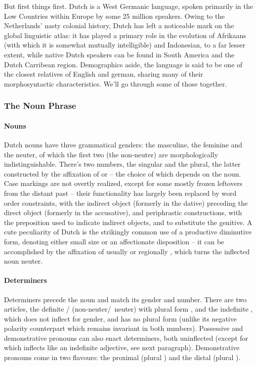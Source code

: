 But first things first.
Dutch is a West Germanic language, spoken primarily in the Low Countries within Europe by some 25 million speakers.
Owing to the Netherlands' nasty colonial history, Dutch has left a noticeable mark on the global linguistic atlas: it has played a primary role in the evolution of Afrikaans (with which it is somewhat mutually intelligible) and Indonesian, to a far lesser extent, while native Dutch speakers can be found in South America and the Dutch Carribean region.
Demographics aside, the language is said to be one of the closest relatives of English and german, sharing many of their morphosyntactic characteristics.
We'll go through some of those together.

\subsubsection{The Noun Phrase}
\paragraph{Nouns}
Dutch nouns have three grammatical genders: the masculine, the feminine and the neuter, of which the first two (the non-neuter) are morphologically indistinguishable.
There's two numbers, the singular and the plural, the latter constructed by the affixation of  or  -- the choice of which depends on the noun.
Case markings are not overtly realized, except for some mostly frozen leftovers from the distant past -- their functionality has largely been replaced by word order constraints, with the indirect object (formerly in the dative) preceding the direct object (formerly in the accusative), and periphrastic constructions, with the preposition  used to indicate indirect objects, and  to substitute the genitive.
A cute peculiarity of Dutch is the strikingly common use of a productive diminutive form, denoting either small size or an affectionate disposition -- it can be accomplished by the affixation of usually  or regionally , which turns the inflected noun neuter.


\paragraph{Determiners}
Determiners precede the noun and match its gender and number.
There are two articles, the definite / (non-neuter/~neuter) with plural form , and the indefinite , which does not inflect for gender, and has no plural form (unlike its negative polarity counterpart  which remains invariant in both numbers).
Possessive and demonstrative pronouns can also enact determiners, both uninflected (except for  which inflects like an indefinite adjective, see next paragraph).
Demonstrative pronouns come in two flavours: the proximal  (plural ) and the distal  (plural ).

